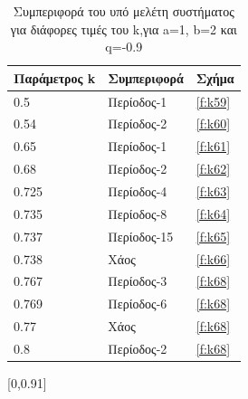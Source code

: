 \begin{table}[h!]
	\centering
	\begin{tabular}{l | l | l}
		Παράμετρος k & Συμπεριφορά & Σχήμα\\
		\hline
		0.5 &  Περίοδος-1 & \ref{f:k59}\\
		0.54 &  Περίοδος-2 & \ref{f:k60}\\
		0.65& Περίοδος-1 & \ref{f:k61}\\
		0.68& Περίοδος-2 & \ref{f:k62}\\
		0.725 &  Περίοδος-4 & \ref{f:k63}\\
		0.735& Περίοδος-8 & \ref{f:k64}\\
		0.737& Περίοδος-15 & \ref{f:k65}\\
		0.738& Χάος & \ref{f:k66}\\
		0.767 &  Περίοδος-3& \ref{f:k68}\\
		0.769 &  Περίοδος-6& \ref{f:k68}\\
		0.77 &  Χάος& \ref{f:k68}\\
		0.8 &  Περίοδος-2& \ref{f:k68}\\
		
	\end{tabular}
	\caption{ Συμπεριφορά του υπό μελέτη συστήματος για διάφορες τιμές του k,για a=1, b=2 και q=-0.9}
	\label{tab:abc6}
\end{table}

[0,0.91]
